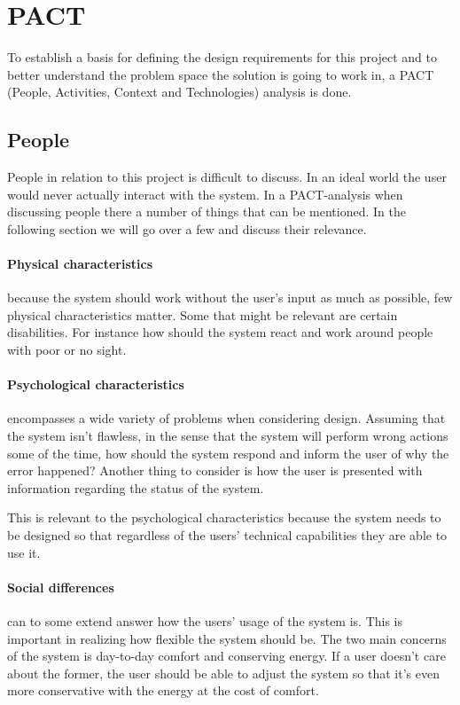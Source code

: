 \section{PACT}
To establish a basis for defining the design requirements for this project and
to better understand the problem space the solution is going to work in, a PACT
(People, Activities, Context and Technologies) analysis is done.

\subsection{People}
People in relation to this project is difficult to discuss. In an ideal world the user would never actually interact with the system. In a PACT-analysis when discussing people there a number of things that can be mentioned. In the following section we will go over a few and discuss their relevance.

\paragraph{Physical characteristics} because the system should work without the user's input as much as possible, few physical characteristics matter. Some that might be relevant are certain disabilities. For instance how should the system react and work around people with poor or no sight.

\paragraph{Psychological characteristics} encompasses a wide variety of problems
when considering design. Assuming that the system isn't flawless, in the
  sense that the system will perform wrong actions some of the time, how should
the system respond and inform the user of why the error happened? Another thing
to consider is how the user is presented with information regarding the status
of the system. 

This is relevant to the psychological characteristics because the system needs to be designed so that regardless of the users' technical capabilities they are able to use it.

\paragraph{Social differences} can to some extend answer how the users' usage of
the system is. This is important in realizing how flexible the system should be.
The two main concerns of the system is day-to-day comfort and conserving energy.
If a user doesn't care about the former, the user should be able to adjust the system so that it's even more conservative with the energy at the cost of comfort. 

